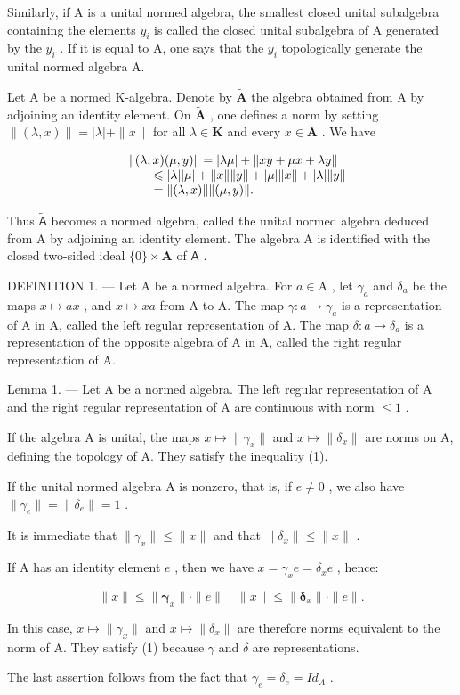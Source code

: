Similarly, if A is a unital normed algebra, the smallest closed unital subalgebra containing the elements \(y_{i}\) is called the closed unital subalgebra of A generated by the \(y_{i}\) . If it is equal to A, one says that the \(y_{i}\) topologically generate the unital normed algebra A.

Let A be a normed K-algebra. Denote by \(\tilde{\mathbf{A}}\) the algebra obtained from A by adjoining an identity element. On \(\tilde{\mathbf{A}}\) , one defines a norm by setting \(\| (\lambda ,x)\| = |\lambda | + \| x\|\) for all \(\lambda \in \mathbf{K}\) and every \(x\in \mathbf{A}\) . We have

\[
\begin{array}{r l} & {\| (\lambda , x) (\mu , y) \| = | \lambda \mu | + \| x y + \mu x + \lambda y \|} \\ & {\qquad \leqslant | \lambda | | \mu | + \| x \| \| y \| + | \mu | \| x \| + | \lambda | \| y \|} \\ & {\qquad = \| (\lambda , x) \| \| (\mu , y) \|.} \end{array}
\]

Thus \(\widetilde{\mathsf{A}}\) becomes a normed algebra, called the unital normed algebra deduced from A by adjoining an identity element. The algebra A is identified with the closed two-sided ideal \(\{0\} \times \mathbf{A}\) of \(\widetilde{\mathsf{A}}\) .

DEFINITION 1. --- Let A be a normed algebra. For \(a \in \mathrm{A}\) , let \(\gamma_{a}\) and \(\delta_{a}\) be the maps \(x \mapsto ax\) , and \(x \mapsto xa\) from A to A. The map \(\gamma: a \mapsto \gamma_{a}\) is a representation of A in A, called the left regular representation of A. The map \(\delta: a \mapsto \delta_{a}\) is a representation of the opposite algebra of A in A, called the right regular representation of A.

Lemma 1. --- Let A be a normed algebra. The left regular representation of A and the right regular representation of A are continuous with norm \(\leqslant 1\) .

If the algebra A is unital, the maps \(x \mapsto \|\gamma_{x}\|\) and \(x \mapsto \|\delta_{x}\|\) are norms on A, defining the topology of A. They satisfy the inequality (1).

If the unital normed algebra A is nonzero, that is, if \(e \neq 0\) , we also have \(\|\gamma_{e}\| = \|\delta_{e}\| = 1\) .

It is immediate that \(\|\gamma_{x}\|\leqslant\|x\|\) and that \(\|\delta_{x}\|\leqslant\|x\|\) .

If A has an identity element \(e\) , then we have \(x = \gamma_x e = \delta_x e\) , hence:

\[
\| x \| \leqslant \| \boldsymbol {\gamma} _ {x} \| \cdot \| e \| \quad \| x \| \leqslant \| \boldsymbol {\delta} _ {x} \| \cdot \| e \|.\tag{2}
\]

In this case, \(x \mapsto \|\gamma_{x}\|\) and \(x \mapsto \|\delta_{x}\|\) are therefore norms equivalent to the norm of A. They satisfy (1) because \(\gamma\) and \(\delta\) are representations.

The last assertion follows from the fact that \(\gamma_{e} = \delta_{e} = Id_{A}\) .

